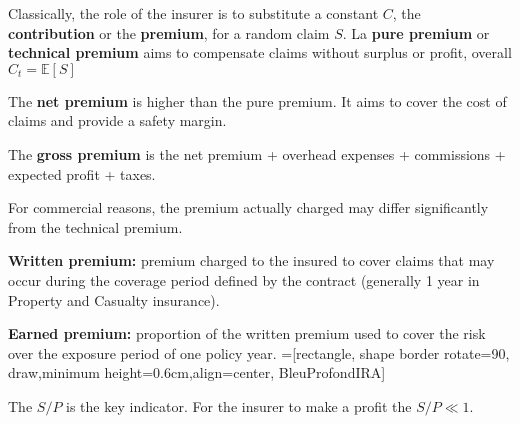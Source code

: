 \begin{f}
Classically, the role of the insurer is to substitute a constant \(C\), the \textbf{contribution} or the \textbf{premium}, for a random claim \(S\).
La \textbf{pure premium} or \textbf{technical premium} aims 
to compensate claims without surplus or profit, overall \(C_t = \mathbb{E}[S]\)
	
	The \textbf{net premium} is higher than the pure premium. It aims to cover the cost of claims and provide a safety margin.
	
	The \textbf{gross premium} is the net premium + overhead expenses + commissions + expected profit + taxes.
	
	For commercial reasons, the premium actually charged may differ significantly from the technical premium.

	\textbf{Written premium:} premium charged to the insured to cover claims that may occur during the 
coverage period defined by the contract (generally 1 year in Property and Casualty insurance).

\textbf{Earned premium:} proportion of the written premium used to cover the risk over the exposure period of 
one policy year.
=[rectangle, shape border rotate=90, draw,minimum height=0.6cm,align=center, BleuProfondIRA]

\resizebox{\linewidth}{!}
{
}
The \(S/P\) is the key indicator. For the insurer to make a profit the \(S/P\ll 1\).
\end{f}

